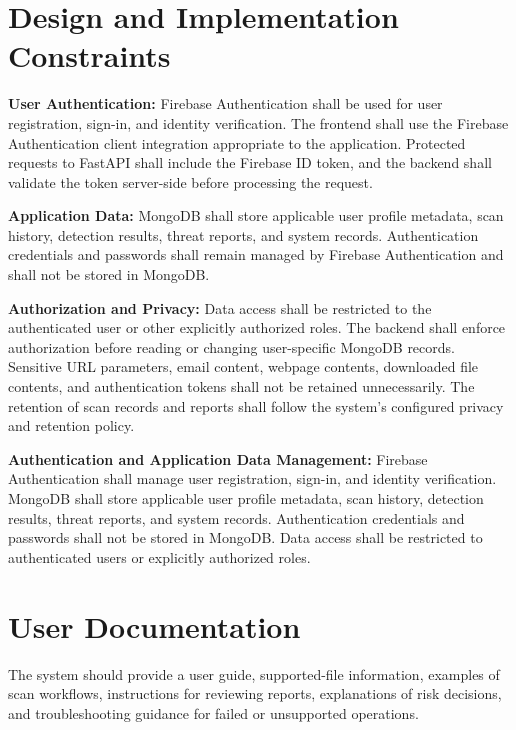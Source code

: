 \documentclass[12pt,a4paper]{report}
\begin{document}
\section{Design and Implementation Constraints}

\textbf{User Authentication:} Firebase Authentication shall be used for user registration, sign-in, and identity verification. The frontend shall use the Firebase Authentication client integration appropriate to the application. Protected requests to FastAPI shall include the Firebase ID token, and the backend shall validate the token server-side before processing the request.\par

\textbf{Application Data:} MongoDB shall store applicable user profile metadata, scan history, detection results, threat reports, and system records. Authentication credentials and passwords shall remain managed by Firebase Authentication and shall not be stored in MongoDB.\par

\textbf{Authorization and Privacy:} Data access shall be restricted to the authenticated user or other explicitly authorized roles. The backend shall enforce authorization before reading or changing user-specific MongoDB records. Sensitive URL parameters, email content, webpage contents, downloaded file contents, and authentication tokens shall not be retained unnecessarily. The retention of scan records and reports shall follow the system's configured privacy and retention policy.\par

\textbf{Authentication and Application Data Management:} Firebase Authentication shall manage user registration, sign-in, and identity verification. MongoDB shall store applicable user profile metadata, scan history, detection results, threat reports, and system records. Authentication credentials and passwords shall not be stored in MongoDB. Data access shall be restricted to authenticated users or explicitly authorized roles.\par

\section{User Documentation}

The system should provide a user guide, supported-file information, examples of scan workflows, instructions for reviewing reports, explanations of risk decisions, and troubleshooting guidance for failed or unsupported operations.\par
\end{document}

